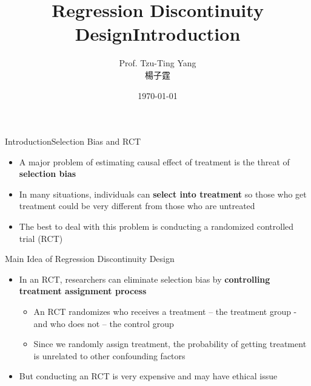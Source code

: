 \documentclass[hyperref={pdfpagelabels=false}]{beamer}
\title[]  
{Regression Discontinuity Design}
\author 
{Prof. Tzu-Ting Yang  \\ 楊子霆}
\institute{Institute of Economics, Academia Sinica  \\ 中央研究院經濟研究所}
\date
{\today}
\begin{document}
	
	

\begin{frame}{}
	\titlepage
\end{frame}


\title[]
{Introduction}

\author
{}

\institute{}

\date
{}

\begin{frame}{}
	\titlepage
\end{frame}



	
	
	
	\begin{frame}{Introduction}{Selection Bias and RCT}
		\begin{itemize}
			\item A major problem of estimating causal effect of treatment is the threat of \textbf{selection bias}
			\vspace{0.2cm}
			\item In many situations, individuals can \textbf{select into treatment} so those who get treatment could be very different from those who are untreated	
			\vspace{0.2cm}	
			\item The best to deal with this problem is conducting a randomized controlled trial (RCT)
			
			
			
			
			
			
		\end{itemize}
	\end{frame}
	
	
	
	\begin{frame}{Main Idea of Regression Discontinuity Design}{}
		\begin{itemize}
			
			\item In an RCT, researchers can eliminate selection bias by \textbf{controlling treatment assignment process}
			\vspace{0.2cm}
					\begin{itemize}
			
			\item An RCT randomizes who receives a treatment – the treatment group - and who does not – the control group
			\vspace{0.2cm}

			\item Since we randomly assign treatment, the probability of getting treatment is unrelated to other confounding factors 
								\end{itemize}	
			\vspace{0.2cm}	
			\item But conducting an RCT is very expensive and may have ethical issue
			
			
			
		\end{itemize}
	\end{frame}
	
\end{document}
